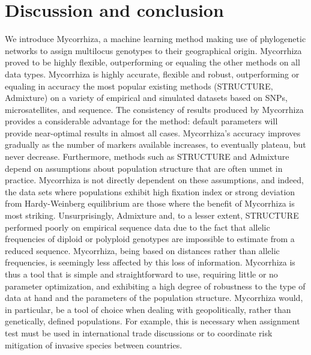 \documentclass[final]{bioinfo}
\begin{document}
\section{Discussion and conclusion}
We introduce Mycorrhiza, a machine learning method making use of phylogenetic networks to assign multilocus genotypes to their geographical origin. Mycorrhiza proved to be highly flexible, outperforming or equaling the other methods on all data types. Mycorrhiza is highly accurate, flexible and robust, outperforming or equaling in accuracy the most popular existing methods (STRUCTURE, Admixture) on a variety of empirical and simulated datasets based on SNPs, microsatellites, and sequence. The consistency of results produced by Mycorrhiza provides a considerable advantage for the method: default parameters will provide near-optimal results in almost all cases. Mycorrhiza’s accuracy improves gradually as the number of markers available increases, to eventually plateau, but never decrease. Furthermore, methods such as STRUCTURE and Admixture depend on assumptions about population structure that are often unmet in practice. Mycorrhiza is not directly dependent on these assumptions, and indeed, the data sets where populations exhibit high fixation index or strong deviation from Hardy-Weinberg equilibrium are those where the benefit of Mycorrhiza is most striking. Unsurprisingly, Admixture and, to a lesser extent, STRUCTURE performed poorly on empirical sequence data due to the fact that allelic frequencies of diploid or polyploid genotypes are impossible to estimate from a reduced sequence. Mycorrhiza, being based on distances rather than allelic frequencies, is seemingly less affected by this loss of information. Mycorrhiza is thus a tool that is simple and straightforward to use, requiring little or no parameter optimization, and exhibiting a high degree of robustness to the type of data at hand and the parameters of the population structure. Mycorrhiza would, in particular, be a tool of choice when dealing with geopolitically, rather than genetically, defined populations. For example, this is necessary when assignment test must be used in international trade discussions or to coordinate risk mitigation of invasive species between countries.\\
\end{document}

